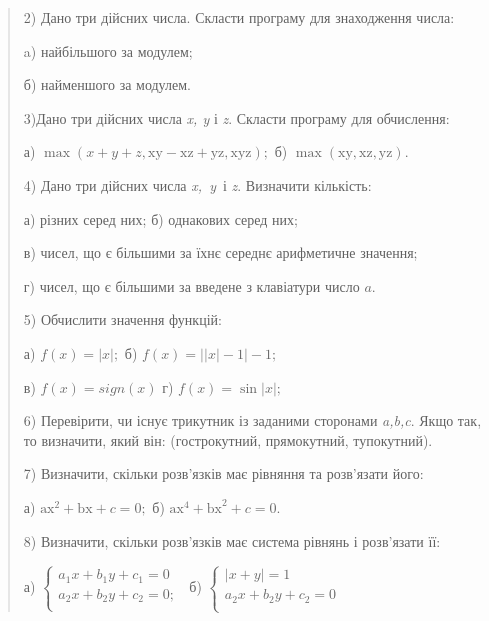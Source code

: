 \documentclass[]{article}
\begin{document}
\begin{quote}
2) Дано три дійсних числа. Скласти програму для знаходження числа:

a) найбільшого за модулем;

б) найменшого за модулем.

3)Дано три дійсних числа \emph{x, y} і \emph{z}. Скласти програму для
обчислення:

а)
\(\mathrm{\max}\left( x + y + z,\mathrm{\text{xy}} - \mathrm{\text{xz}} + \mathrm{\text{yz}},\mathrm{\text{xyz}} \right);\)
б)
\(\mathrm{\max}\left( \mathrm{\text{xy}},\mathrm{\text{xz}},\mathrm{\text{yz}} \right)\mathrm{.}\)

4) Дано три дійсних числа \emph{x,~y}~і \emph{z}. Визначити кількість:

а) різних серед них; б) однакових серед них;

в) чисел, що є більшими за їхнє середнє арифметичне значення;

г) чисел, що є більшими за введене з клавіатури число \(a\).

5) Обчислити значення функцій:

а) \(f\left( x \right) = \left| x \right|;\) б)
\(f\left( x \right) = \left| \left| x \right| - 1 \right| - 1;\)

в) \(f\left( x \right) = sign(x)\) г)
\(f\left( x \right) = \mathrm{\sin}\left| x \right|;\)

6) Перевірити, чи існує трикутник із заданими сторонами \emph{a,b,c}.
Якщо так, то визначити, який він: (гострокутний, прямокутний,
тупокутний).

7) Визначити, скільки розв'язків має рівняння та розв'язати його:

а) \(\mathrm{\text{ax}}^{2} + \mathrm{\text{bx}} + c = 0;\) б)
\(\mathrm{\text{ax}}^{4} + \mathrm{\text{bx}}^{2} + c = 0\mathrm{.}\)

8) Визначити, скільки розв'язків має система рівнянь і розв'язати її:

а) \(\left\{ \begin{matrix}
a_{1}x + b_{1}y + c_{1} = 0 \\
a_{2}x + b_{2}y + c_{2} = 0; \\
\end{matrix} \right.\ \) б) \(\left\{ \begin{matrix}
\left| x + y \right| = 1 \\
a_{2}x + b_{2}y + c_{2} = 0 \\
\end{matrix} \right.\ \)
\end{quote}
\end{document}
